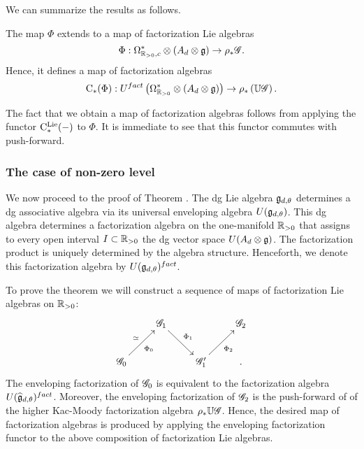 \documentclass[10pt]{amsart}
\begin{document}
We can summarize the results as follows.

\begin{prop}\label{prop: fact lie}The map $\Phi$ extends to a map of factorization Lie algebras
\[
\Phi : \Omega^*_{\mathbb R_{>0},c} \otimes (A_d \otimes \mathfrak g) \to \rho_*\mathscr G .
\] 
Hence, it defines a map of factorization algebras
\[
{\rm C}_*(\Phi) : U^{fact}\left(\Omega^{*}_{\mathbb R_{>0}} \otimes (A_d \otimes \mathfrak g)\right) \to \rho_*\left(\mathbb U \mathscr G \right) .
\]
\end{prop}

The fact that we obtain a map of factorization algebras follows from applying the functor ${\rm C}^{\rm Lie}_*(-)$ to $\Phi$. It is immediate to see that this functor commutes with push-forward. 

\subsubsection{The case of non-zero level}

We now proceed to the proof of Theorem \label{thm sphere alg}. 
The dg Lie algebra $\mathfrak g_{d,\theta}$ determines a dg associative algebra via its universal enveloping algebra $U(\mathfrak g_{d,\theta})$.
This dg algebra determines a factorization algebra on the one-manifold $\mathbb R_{>0}$ that assigns to every open interval $I \subset \mathbb R_{>0}$ the dg vector space $U(A_d \otimes \mathfrak g)$. 
The factorization product is uniquely determined by the algebra structure. 
Henceforth, we denote this factorization algebra by $U(\mathfrak g_{d,\theta})^{fact}$.

To prove the theorem we will construct a sequence of maps of factorization Lie algebras on $\mathbb R_{>0}$:
\[
\xymatrix{
& \sG_1 \ar[dr]^-{\Phi_1} & & \sG_2 \\
\sG_0 \ar[ur]^-{\simeq}_{\Phi_0} & & \sG_1' \ar[ur]_{\Phi_2} & .
}
\]
The enveloping factorization of $\mathscr G_0$ is equivalent to the factorization algebra $U (\widehat{\mathfrak g}_{d,\theta})^{fact}$. 
Moreover, the enveloping factorization of $\mathscr G_2$ is the push-forward of of the higher Kac-Moody factorization algebra $\rho_* \mathbb U \mathscr G$. 
Hence, the desired map of factorization algebras is produced by applying the enveloping factorization functor to the above composition of factorization Lie algebras. 
\end{document}
